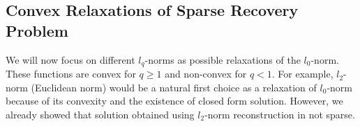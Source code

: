 \documentclass[journal]{IEEEtran}
\begin{document}
\subsection{Convex Relaxations of Sparse Recovery Problem}

We will now focus on different $l_q$-norms as possible relaxations of the $l_0$-norm. These functions are convex for $q\geq 1$ and non-convex for $q<1$. For example, $l_2$-norm (Euclidean norm) would be a natural first choice as a relaxation of $l_0$-norm because of its convexity and the existence of closed form solution. However, we already showed that solution obtained using $l_2$-norm reconstruction in not sparse.
%
%
%

%
\end{document}
